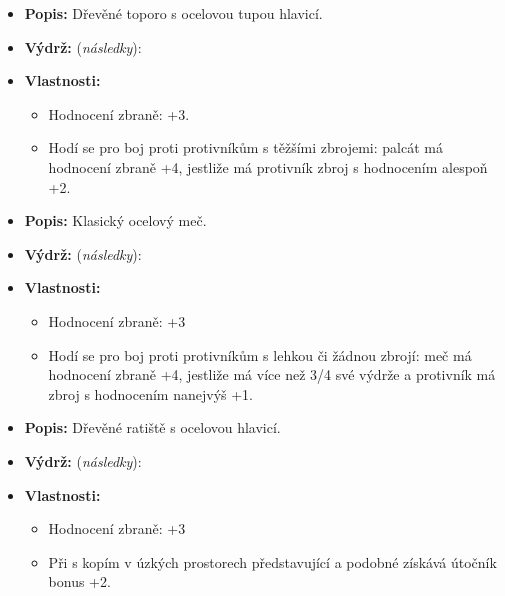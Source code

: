 \documentclass[../main.tex]{subfiles}
\begin{document}
	\begin{predmet}
	\begin{itemize}
		\item \textbf{Popis:} Dřevěné toporo s ocelovou tupou hlavicí.
		\item \textbf{Výdrž:} (\emph{následky}): 
		\item \textbf{Vlastnosti:} 
			\begin{itemize}
				\item Hodnocení zbraně: +3. 
				\item Hodí se pro boj proti protivníkům s těžšími zbrojemi: palcát má hodnocení zbraně +4, jestliže má protivník zbroj s hodnocením alespoň +2.
			\end{itemize}
	\end{itemize}
	\end{predmet}

	\begin{predmet}
	\begin{itemize}
		\item \textbf{Popis:} Klasický ocelový meč. \sidenotemark 
		\item \textbf{Výdrž:} (\emph{následky}): 
		\item \textbf{Vlastnosti:}
			\begin{itemize}
				\item Hodnocení zbraně: +3 
				\item Hodí se pro boj proti protivníkům s lehkou či žádnou zbrojí: meč má hodnocení zbraně +4, jestliže má více než 3/4 své výdrže a protivník má zbroj s hodnocením nanejvýš +1. \sidenotemark
			\end{itemize}
	\end{itemize}
	\end{predmet}

\begin{predmet}[Kopí]
\begin{itemize}
	\item \textbf{Popis:} Dřevěné ratiště s ocelovou hlavicí.
	\item \textbf{Výdrž:} (\emph{následky}): 
	\item \textbf{Vlastnosti:}
		\begin{itemize}
			\item Hodnocení zbraně: +3
			\item {} Při  s kopím v úzkých prostorech představující  a podobné získává útočník bonus +2.
		\end{itemize} 
\end{itemize}
\end{predmet}
\end{document}
